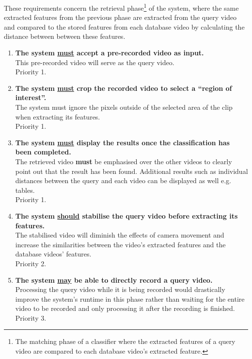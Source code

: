 These requirements concern the retrieval phase\footnote{The matching phase of a classifier where the extracted features of a query video are compared to each database video's extracted feature.} of the system, where the same extracted features from the previous phase are extracted from the query video and compared to the stored features from each database video by calculating the distance between between these features.

\begin{enumerate}

    \item \textbf{The system \underline{must} accept a pre-recorded video as input.}\\
    This pre-recorded video will serve as the query video.\\
    Priority 1.
    
    \item \textbf{The system \underline{must} crop the recorded video to select a ``region of interest''.}\\
    The system must ignore the pixels outside of the selected area of the clip when extracting its features.\\
    Priority 1.
    
    \item \textbf{The system \underline{must} display the results once the classification has been completed.}\\
    The retrieved video \textbf{must} be emphasised over the other videos to clearly point out that the result has been found. Additional results such as individual distances between the query and each video can be displayed as well e.g. tables.\\
    Priority 1.
    
    \item \textbf{The system \underline{should} stabilise the query video before extracting its features.}\\
    The stabilised video will diminish the effects of camera movement and increase the similarities between the video's extracted features and the database videos' features.\\
    Priority 2.
    
    \item \textbf{The system \underline{may} be able to directly record a query video.}\\
    Processing the query video while it is being recorded would drastically improve the system's runtime in this phase rather than waiting for the entire video to be recorded and only processing it after the recording is finished.\\
    Priority 3.
    
    

\end{enumerate}


